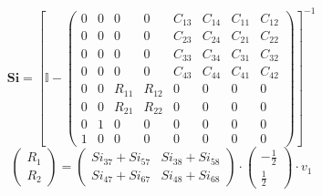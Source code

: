 \documentclass[10pt]{article} \usepackage{amsmath} \usepackage{bbold}
\begin{document}
\[ \mathbf{Si} = \left[ \mathbb{I}  - \left(\begin{array}{cccccccc} 0
& 0 & 0 & 0 & C_{13} & C_{14} & C_{11} & C_{12} \\ 0 & 0 & 0 & 0 &
C_{23} & C_{24} & C_{21} & C_{22} \\ 0 & 0 & 0 & 0 & C_{33} & C_{34} &
C_{31} & C_{32} \\ 0 & 0 & 0 & 0 & C_{43} & C_{44} & C_{41} & C_{42}
\\ 0 & 0 & R_{11} & R_{12} & 0 & 0 & 0 & 0 \\ 0 & 0 & R_{21} & R_{22}
& 0 & 0 & 0 & 0 \\ 0 & 1 & 0 & 0 & 0 & 0 & 0 & 0 \\ 1 & 0 & 0 & 0 & 0
& 0 & 0 & 0 \end{array}\right) \right]^{-1} \]
\[ \left(\begin{array}{c} R_{1} \\ R_{2}
\end{array}\right)=\left(\begin{array}{cc} Si_{37} + Si_{57} & Si_{38}
+ Si_{58} \\ Si_{47} + Si_{67} & Si_{48} + Si_{68} \end{array}\right)
\cdot \left(\begin{array}{c} -\frac{1}{2} \\ \frac{1}{2}
\end{array}\right)\cdot v_{1} \]
\end{document}
